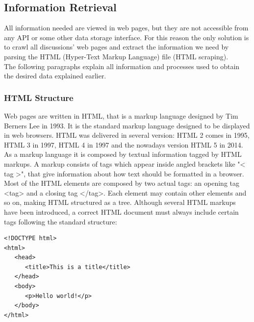 \subsection{Information Retrieval}

All information needed are viewed in web pages, but they are not accessible from any API or some other data storage interface. For this reason the only solution is to crawl all discussions' web pages and extract the information we need by parsing the HTML (Hyper-Text Markup Language) file (HTML scraping). \\
The following paragraphs explain all information and processes used to obtain the desired data explained earlier.

\subsubsection{HTML Structure}

Web pages are written in HTML, that is a markup language designed by Tim Berners Lee in 1993. It is the standard markup language designed to be displayed in web browsers. HTML was delivered in several version: HTML 2 comes in 1995, HTML 3 in 1997, HTML 4 in 1997 and the nowadays version HTML 5 in 2014. \\
As a markup language it is composed by textual information tagged by HTML markups. A markup consists of tags which appear inside angled brackets  like "< tag >", that give information about how text should be formatted in a browser.	Most of the HTML elements are composed by two actual tags: an opening tag <tag> and a closing tag </tag>. Each element may contain other elements and so on, making HTML structured as a tree. Although several HTML markups have been introduced, a correct HTML document must always include certain tags following the standard structure:

\begin{center}
\begin{lstlisting}
<!DOCTYPE html>
<html>
   <head>
      <title>This is a title</title>
   </head>
   <body>
      <p>Hello world!</p>
   </body>
</html>
\end{lstlisting}
\end{center}

